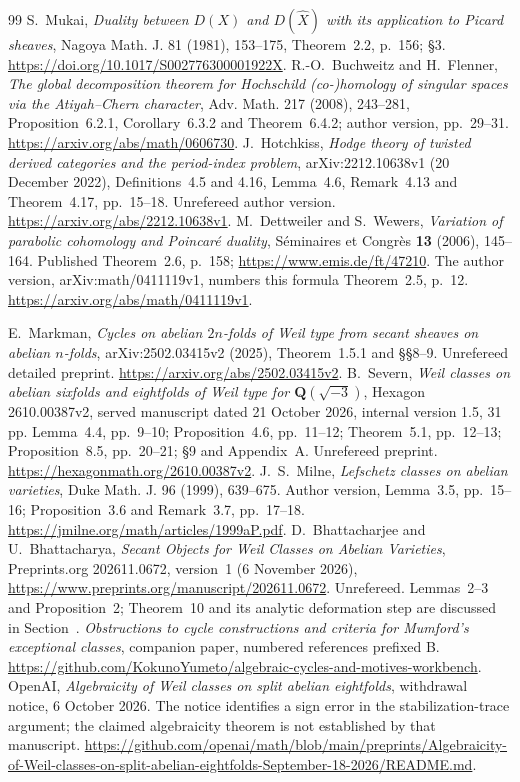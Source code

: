 \documentclass[11pt]{article}
\theoremstyle{definition}
\theoremstyle{remark}
\newcommand{\Q}{\mathbf Q}
\newcommand{\workbenchurl}{https://github.com/KokunoYumeto/algebraic-cycles-and-motives-workbench}
\begin{document}
\begin{thebibliography}{99}
 S.~Mukai, \emph{Duality between $D(X)$ and $D(\widehat X)$ with its application to Picard sheaves}, Nagoya Math. J. 81 (1981), 153--175, Theorem~2.2, p.~156; \S3. \url{https://doi.org/10.1017/S002776300001922X}.
 R.-O.~Buchweitz and H.~Flenner, \emph{The global decomposition theorem for Hochschild (co-)homology of singular spaces via the Atiyah--Chern character}, Adv. Math. 217 (2008), 243--281, Proposition~6.2.1, Corollary~6.3.2 and Theorem~6.4.2; author version, pp.~29--31. \url{https://arxiv.org/abs/math/0606730}.
 J.~Hotchkiss, \emph{Hodge theory of twisted derived categories and the period-index problem}, arXiv:2212.10638v1 (20 December 2022), Definitions~4.5 and 4.16, Lemma~4.6, Remark~4.13 and Theorem~4.17, pp.~15--18. Unrefereed author version. \url{https://arxiv.org/abs/2212.10638v1}.
M.~Dettweiler and S.~Wewers, \emph{Variation of parabolic cohomology
and Poincar\'e duality}, S\'eminaires et Congr\`es \textbf{13}
(2006), 145--164. Published Theorem~2.6, p.~158;
\url{https://www.emis.de/ft/47210}.
The author version, arXiv:math/0411119v1, numbers this formula
Theorem~2.5, p.~12. \url{https://arxiv.org/abs/math/0411119v1}.

 E.~Markman, \emph{Cycles on abelian $2n$-folds of Weil type from secant sheaves on abelian $n$-folds}, arXiv:2502.03415v2 (2025), Theorem~1.5.1 and \S\S8--9. Unrefereed detailed preprint. \url{https://arxiv.org/abs/2502.03415v2}.
 B.~Severn, \emph{Weil classes on abelian sixfolds and eightfolds of Weil type for $\Q(\sqrt{-3})$}, Hexagon 2610.00387v2, served manuscript dated 21 October 2026, internal version 1.5, 31 pp. Lemma~4.4, pp.~9--10; Proposition~4.6, pp.~11--12; Theorem~5.1, pp.~12--13; Proposition~8.5, pp.~20--21; \S9 and Appendix~A. Unrefereed preprint. \url{https://hexagonmath.org/2610.00387v2}.
 J.~S.~Milne, \emph{Lefschetz classes on abelian varieties}, Duke Math. J. 96 (1999), 639--675. Author version, Lemma~3.5, pp.~15--16; Proposition~3.6 and Remark~3.7, pp.~17--18. \url{https://jmilne.org/math/articles/1999aP.pdf}.
 D.~Bhattacharjee and U.~Bhattacharya,
\emph{Secant Objects for Weil Classes on Abelian Varieties},
Preprints.org 202611.0672, version~1 (6 November 2026),
\url{https://www.preprints.org/manuscript/202611.0672}.
Unrefereed. Lemmas~2--3 and Proposition~2; Theorem~10 and its
analytic deformation step are discussed in Section~.
 \emph{Obstructions to cycle constructions and criteria for Mumford's exceptional classes}, companion paper, numbered references prefixed B. \url{\workbenchurl}.
 OpenAI, \emph{Algebraicity of Weil classes on split abelian eightfolds}, withdrawal notice, 6 October 2026. The notice identifies a sign error in the stabilization-trace argument; the claimed algebraicity theorem is not established by that manuscript. \url{https://github.com/openai/math/blob/main/preprints/Algebraicity-of-Weil-classes-on-split-abelian-eightfolds-September-18-2026/README.md}.


\end{thebibliography}
\end{document}
